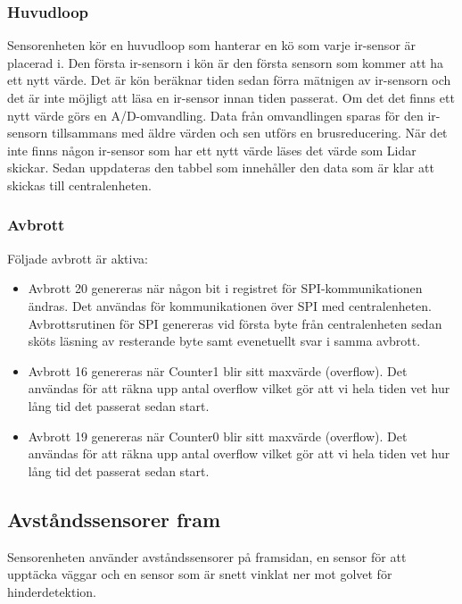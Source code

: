 \documentclass[a4paper,titlepage,12pt]{article}
\begin{document}
    \subsubsection{Huvudloop}
    Sensorenheten kör en huvudloop som hanterar en kö som varje ir-sensor är placerad 
    i. Den första ir-sensorn i kön är den första sensorn som kommer att ha ett nytt 
    värde. Det är kön beräknar tiden sedan förra mätnigen av ir-sensorn och det är inte 
    möjligt att läsa en ir-sensor innan tiden passerat. Om det det finns ett nytt värde 
    görs en A/D-omvandling. Data från omvandlingen sparas för den ir-sensorn 
    tillsammans med äldre värden och sen utförs en brusreducering. När det inte finns 
    någon ir-sensor som har ett nytt värde läses det värde som Lidar skickar. Sedan 
    uppdateras den tabbel som innehåller den data som är klar att skickas till 
    centralenheten. 

    \subsubsection{Avbrott}
	Följade avbrott är aktiva:
    \begin{itemize}
        \item Avbrott 20 genereras när någon bit i registret för SPI-kommunikationen
            ändras. Det användas för kommunikationen över SPI med centralenheten. 
            Avbrottsrutinen för SPI genereras vid första byte från centralenheten 
            sedan sköts läsning av resterande byte samt evenetuellt svar i samma 
            avbrott. 
		\item Avbrott 16 genereras när Counter1 blir sitt maxvärde (overflow). 
			Det användas för att räkna upp antal overflow vilket gör att vi hela tiden 
			vet hur lång tid det passerat sedan start. 
		\item Avbrott 19 genereras när Counter0 blir sitt maxvärde (overflow). 
			Det användas för att räkna upp antal overflow vilket gör att vi hela tiden 
			vet hur lång tid det passerat sedan start. 
    \end{itemize}
	
	\subsection{Avståndssensorer fram}
	
	Sensorenheten använder avståndssensorer på framsidan, en sensor för att
	upptäcka väggar och en sensor som är snett vinklat ner mot golvet för 
	hinderdetektion. 
\end{document}
